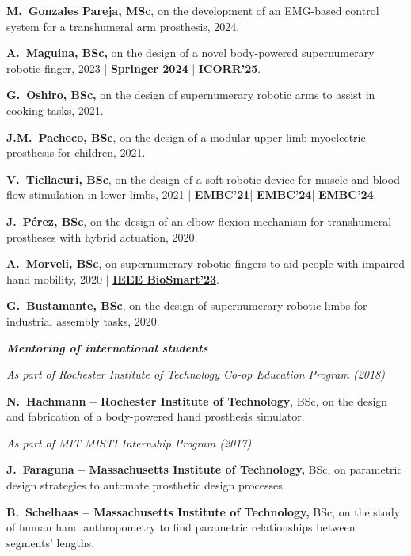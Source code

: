 \documentclass[a4paper,10pt]{article}
\begin{document}
\textbf{M.\ Gonzales Pareja, MSc}, on the development of an EMG-based control system for a
transhumeral arm prosthesis, 2024.

\textbf{A.\ Maguina, BSc,} on the design of a novel body-powered supernumerary robotic finger,
2023 |
\href{https://link.springer.com/chapter/10.1007/978-3-031-49407-9_52}{\textbf{Springer 2024}} |
\href{https://ieeexplore.ieee.org/document/11063063}{\textbf{ICORR'25}}.

\textbf{G.\ Oshiro, BSc,} on the design of supernumerary robotic arms to assist in cooking
tasks, 2021.

\textbf{J.M.\ Pacheco, BSc}, on the design of a modular upper-limb myoelectric prosthesis for
children, 2021.

\textbf{V.\ Ticllacuri, BSc}, on the design of a soft robotic device for muscle and blood flow
stimulation in lower limbs, 2021 |
\href{https://ieeexplore.ieee.org/document/9630974}{\textbf{EMBC'21}}|%
\href{https://ieeexplore.ieee.org/document/10782886}{\textbf{EMBC'24}}|%
\href{https://ieeexplore.ieee.org/document/10782663}{\textbf{EMBC'24}}.

\textbf{J.\ P\'erez, BSc}, on the design of an elbow flexion mechanism for transhumeral
prostheses with hybrid actuation, 2020.

\textbf{A.\ Morveli, BSc}, on supernumerary robotic fingers to aid people with impaired hand
mobility, 2020 |
\href{https://ieeexplore.ieee.org/abstract/document/10162114}{\textbf{IEEE BioSmart'23}}.

\textbf{G.\ Bustamante, BSc}, on the design of supernumerary robotic limbs for industrial
assembly tasks, 2020.

\vspace{4pt}
\textbf{\textit{Mentoring of international students}}

\vspace{2pt}
\textit{As part of Rochester Institute of Technology Co-op Education Program (2018)}

\textbf{N.\ Hachmann -- Rochester Institute of Technology}, BSc, on the design and fabrication
of a body-powered hand prosthesis simulator.

\vspace{2pt}
\textit{As part of MIT MISTI Internship Program (2017)}

\textbf{J.\ Faraguna -- Massachusetts Institute of Technology,} BSc, on parametric design
strategies to automate prosthetic design processes.

\textbf{B.\ Schelhaas -- Massachusetts Institute of Technology,} BSc, on the study of human hand
anthropometry to find parametric relationships between segments' lengths.
\end{document}
